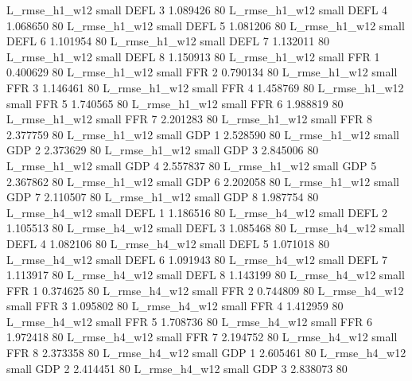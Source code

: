 L_rmse_h1_w12      small     DEFL                 3 1.089426 80
L_rmse_h1_w12      small     DEFL                 4 1.068650 80
L_rmse_h1_w12      small     DEFL                 5 1.081206 80
L_rmse_h1_w12      small     DEFL                 6 1.101954 80
L_rmse_h1_w12      small     DEFL                 7 1.132011 80
L_rmse_h1_w12      small     DEFL                 8 1.150913 80
L_rmse_h1_w12      small      FFR                 1 0.400629 80
L_rmse_h1_w12      small      FFR                 2 0.790134 80
L_rmse_h1_w12      small      FFR                 3 1.146461 80
L_rmse_h1_w12      small      FFR                 4 1.458769 80
L_rmse_h1_w12      small      FFR                 5 1.740565 80
L_rmse_h1_w12      small      FFR                 6 1.988819 80
L_rmse_h1_w12      small      FFR                 7 2.201283 80
L_rmse_h1_w12      small      FFR                 8 2.377759 80
L_rmse_h1_w12      small      GDP                 1 2.528590 80
L_rmse_h1_w12      small      GDP                 2 2.373629 80
L_rmse_h1_w12      small      GDP                 3 2.845006 80
L_rmse_h1_w12      small      GDP                 4 2.557837 80
L_rmse_h1_w12      small      GDP                 5 2.367862 80
L_rmse_h1_w12      small      GDP                 6 2.202058 80
L_rmse_h1_w12      small      GDP                 7 2.110507 80
L_rmse_h1_w12      small      GDP                 8 1.987754 80
L_rmse_h4_w12      small     DEFL                 1 1.186516 80
L_rmse_h4_w12      small     DEFL                 2 1.105513 80
L_rmse_h4_w12      small     DEFL                 3 1.085468 80
L_rmse_h4_w12      small     DEFL                 4 1.082106 80
L_rmse_h4_w12      small     DEFL                 5 1.071018 80
L_rmse_h4_w12      small     DEFL                 6 1.091943 80
L_rmse_h4_w12      small     DEFL                 7 1.113917 80
L_rmse_h4_w12      small     DEFL                 8 1.143199 80
L_rmse_h4_w12      small      FFR                 1 0.374625 80
L_rmse_h4_w12      small      FFR                 2 0.744809 80
L_rmse_h4_w12      small      FFR                 3 1.095802 80
L_rmse_h4_w12      small      FFR                 4 1.412959 80
L_rmse_h4_w12      small      FFR                 5 1.708736 80
L_rmse_h4_w12      small      FFR                 6 1.972418 80
L_rmse_h4_w12      small      FFR                 7 2.194752 80
L_rmse_h4_w12      small      FFR                 8 2.373358 80
L_rmse_h4_w12      small      GDP                 1 2.605461 80
L_rmse_h4_w12      small      GDP                 2 2.414451 80
L_rmse_h4_w12      small      GDP                 3 2.838073 80
